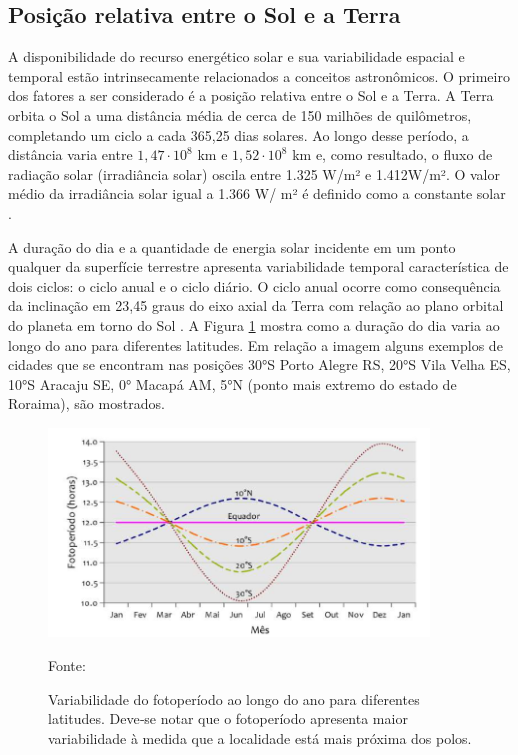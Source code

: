 \subsection{Posição relativa entre o Sol e a Terra}

A disponibilidade do recurso energético solar e sua variabilidade espacial e temporal estão intrinsecamente relacionados a conceitos astronômicos. O primeiro dos fatores a ser considerado é a posição relativa entre o Sol e a Terra. A Terra orbita o Sol a uma distância média de cerca de 150 milhões de quilômetros, completando um ciclo a cada 365,25 dias solares. Ao longo desse período, a distância varia entre $1,47 \cdot 10^8$ km e $1,52 \cdot 10^8$ km e, como resultado, o fluxo de radiação solar (irradiância solar) oscila entre 1.325 W/m² e 1.412W/m². O valor médio da irradiância solar igual a 1.366 W/ m² é definido como a constante solar \cite{nrel} \cite{atlas2017}.

A duração do dia e a quantidade de energia solar incidente em um ponto qualquer da superfície terrestre apresenta variabilidade temporal característica de dois ciclos: o ciclo anual e o ciclo diário. O ciclo anual ocorre como consequência da inclinação em 23,45 graus do eixo axial da Terra com relação ao plano orbital do planeta em torno do Sol \cite{atlas2017}.  A Figura \ref{fig:dia_luz} mostra como a duração do dia varia ao longo do ano para diferentes latitudes. Em relação a imagem alguns exemplos de cidades que se encontram nas posições 30°S Porto Alegre RS, 20°S Vila Velha ES, 10°S Aracaju SE, 0° Macapá AM, 5°N (ponto mais extremo do estado de Roraima), são mostrados.

\begin{figure}[H]
    \centering
    \includegraphics[width=0.9\textwidth]{./Figuras/dia_luz.png}
    \caption{Variabilidade do fotoperíodo ao longo do ano para diferentes latitudes. Deve‐se notar que o fotoperíodo apresenta maior variabilidade à medida que a localidade está mais próxima dos polos.}{Fonte: \cite{atlas2017}}
   \label{fig:dia_luz}
\end{figure}

